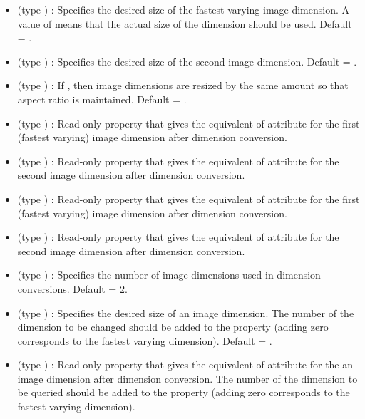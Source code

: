 \begin{itemize}
\item {} (type ) : Specifies the
desired size of the fastest varying image dimension. A value of
 means that the actual size of the dimension
should be used. Default = .

\item {} (type ) : Specifies the
desired size of the second image dimension. Default =
. 

\item {} (type ) : If ,
then image dimensions are resized by the same amount so that aspect
ratio is maintained. Default = .

\item {} (type ) : Read-only
property that gives the equivalent of attribute  for the
first (fastest varying) image dimension after dimension conversion.

\item {} (type ) : Read-only
property that gives the equivalent of attribute  for the
second image dimension after dimension conversion.

\item {} (type ) : Read-only
property that gives the equivalent of attribute  for the
first (fastest varying) image dimension after dimension conversion.

\item {} (type ) : Read-only
property that gives the equivalent of attribute  for the
second image dimension after dimension conversion.

\item {} (type ) : Specifies the
number of image dimensions used in dimension conversions. Default = 2.

\item {} (type ) : Specifies the
desired size of an image dimension. The number of the dimension to be
changed should be added to the property (adding zero corresponds to
the fastest varying dimension). Default = . 

\item {} (type ) : Read-only
property that gives the equivalent of attribute  for the
an image dimension after dimension conversion. The number of the
dimension to be queried should be added to the property (adding zero
corresponds to the fastest varying dimension). 


\end{itemize}
